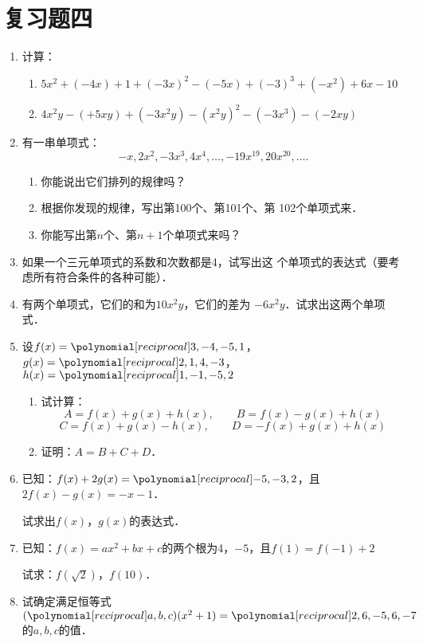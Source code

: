 \section*{复习题四}
\begin{enumerate}
    \item 计算：
    \begin{enumerate}
        \item $5x^2+(-4x)+1+(-3x)^2-(-5x)+(-3)^3+(-x^2)+6x-10$
        \item $4x^2y-(+5xy)+(-3x^2y)-(x^2y)^2-(-3x^3)-(-2xy)$
    \end{enumerate}
\item 有一串单项式：
\[-x,2x^2,-3x^3,4x^4,\ldots,-19x^{19},20x^{20},\ldots. \]
\begin{enumerate}
    \item 你能说出它们排列的规律吗？
    \item 根据你发现的规律，写出第100个、第101个、第
102个单项式来．
\item 你能写出第$n$个、第$n+1$个单项式来吗？
\end{enumerate}

\item 如果一个三元单项式的系数和次数都是4，试写出这
个单项式的表达式（要考虑所有符合条件的各种可能）．
\item  有两个单项式，它们的和为$10x^2y$，它们的差为
$-6x^2y$．试求出这两个单项式．

\item 设$f(x)=\poly{3,-4,-5,1}$，$g(x)=\poly{2,1,4,-3}$，$h(x)=\poly{1,-1,-5,2}$
\begin{enumerate}
    \item 试计算：
    \[A=f(x)+g(x)+h(x),\qquad B=f(x)-g(x)+h(x)\]
    \[C=f(x)+g(x)-h(x),\qquad D=-f(x)+g(x)+h(x)\]
    \item 证明：$A=B+C+D$．
\end{enumerate}

\item 已知：$f(x)+2g(x)=\poly{-5,-3,2}$，且$2f(x)-g(x)=-x-1$．

试求出$f(x)$，$g(x)$的表达式．

\item 已知：$f(x)=ax^2+bx+c$的两个根为4，$-5$，且$f(1)=f(-1)+2$

试求：$f\left(\sqrt{2}\right)$，$f(10)$．

\item 试确定满足恒等式
$(\poly{a,b,c})(x^2+1)=\poly{2,6,-5,6,-7}$
的$a,b,c$的值．


\end{enumerate}
